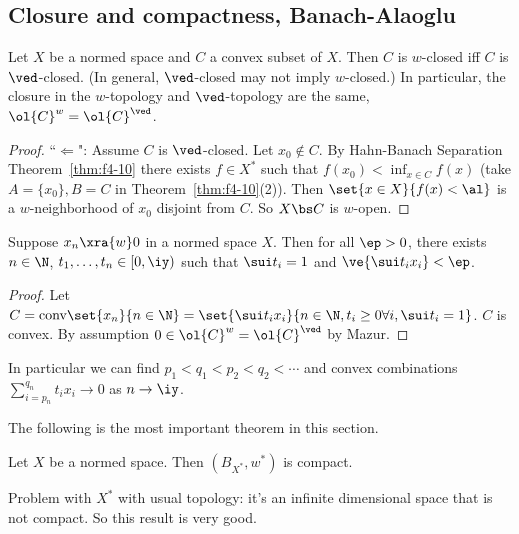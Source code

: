 \subsection{Closure and compactness, Banach-Alaoglu}
\begin{thm}[Mazur]
Let $X$ be a normed space and $C$ a convex subset of $X$. Then $C$ is $w$-closed iff $C$ is $\ved$-closed. (In general, $\ved$-closed may not imply $w$-closed.) In particular, the closure in the $w$-topology and $\ved$-topology are the same, $\ol{C}^{w}=\ol{C}^{\ved}$.
\end{thm}
\begin{proof}
``$\Leftarrow$": Assume $C$ is $\ved$-closed. Let $x_0\nin C$. By Hahn-Banach Separation Theorem~\ref{thm:f4-10} there exists $f\in X^*$ 
such that $f(x_0)<\inf_{x\in C} f(x)$ (take $A=\{x_0\},B=C$ in Theorem~\ref{thm:f4-10}(2)). Then $\set{x\in X}{f(x)<\al}$ is a $w$-neighborhood of $x_0$ disjoint from $C$. 
So $X\bs C$ is $w$-open.
\end{proof}
\begin{cor}
Suppose $x_n\xra{w} 0$ in a normed space $X$. Then for all $\ep>0$, there exists $n\in \N$, $t_1,\ldots, t_n\in [0,\iy)$ such that $\sui t_i=1$ and $\ve{\sui t_ix_i}<\ep$. 
\end{cor}
\begin{proof}
Let $C=\text{conv}\set{x_n}{n\in \N}=\set{\sui t_ix_i}{n\in \N,t_i\ge 0\forall i,\sui t_i=1}$. $C$ is convex. By assumption $0\in \ol{C}^w=\ol{C}^{\ved}$ by Mazur.
\end{proof}
\begin{rem}
In particular we can find $p_1<q_1<p_2<q_2<\cdots$ and convex combinations $\sum_{i=p_n}^{q_n} t_ix_i\to 0$ as $n\to \iy$.
\end{rem}
The following is the most important theorem in this section.
\begin{thm}
Let $X$ be a normed space. Then $(B_{X^*},w^*)$ is compact.
\end{thm}
Problem with $X^*$ with usual topology: it's an infinite dimensional space that is not compact. So this result is very good.
